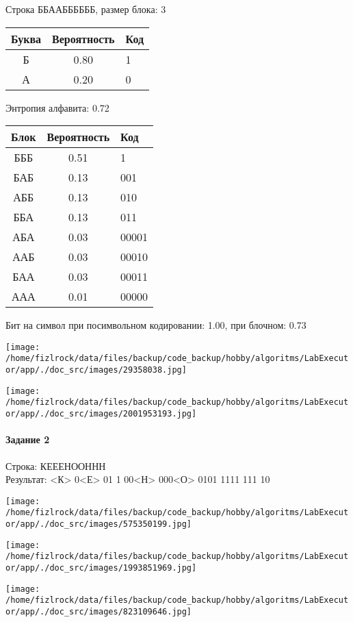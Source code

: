 \documentclass[a4paper, 12pt]{article}
\begin{document}
Строка ББААББББББ, размер блока: 3
\begin{center}
 \begin{tabular}{ |c|c|l| } 
  \hline
     Буква & Вероятность & Код\\ \hline
Б & 0.80 & 1\\\hline
А & 0.20 & 0
\\ \hline \end{tabular}
\end{center}
Энтропия алфавита: 0.72
\begin{center}
 \begin{tabular}{ |c|c|l| } 
  \hline
     Блок & Вероятность & Код\\ \hline
БББ & 0.51 & 1\\\hline
БАБ & 0.13 & 001\\\hline
АББ & 0.13 & 010\\\hline
ББА & 0.13 & 011\\\hline
АБА & 0.03 & 00001\\\hline
ААБ & 0.03 & 00010\\\hline
БАА & 0.03 & 00011\\\hline
ААА & 0.01 & 00000
\\ \hline \end{tabular}
\end{center}
Бит на символ при посимвольном кодировании: 1.00, при блочном: 0.73

\texttt{[image: /home/fizlrock/data/files/backup/code\_backup/hobby/algoritms/LabExecutor/app/./doc\_src/images/29358038.jpg]}

\texttt{[image: /home/fizlrock/data/files/backup/code\_backup/hobby/algoritms/LabExecutor/app/./doc\_src/images/2001953193.jpg]}
\pagebreak
\paragraph{Задание 2}

Строка: 
КЕЕЕНООННН\\
Результат: <К> 0<Е> 01 1 00<Н> 000<О> 0101 1111 111 10

\texttt{[image: /home/fizlrock/data/files/backup/code\_backup/hobby/algoritms/LabExecutor/app/./doc\_src/images/575350199.jpg]}

\texttt{[image: /home/fizlrock/data/files/backup/code\_backup/hobby/algoritms/LabExecutor/app/./doc\_src/images/1993851969.jpg]}

\texttt{[image: /home/fizlrock/data/files/backup/code\_backup/hobby/algoritms/LabExecutor/app/./doc\_src/images/823109646.jpg]}
\end{document}
